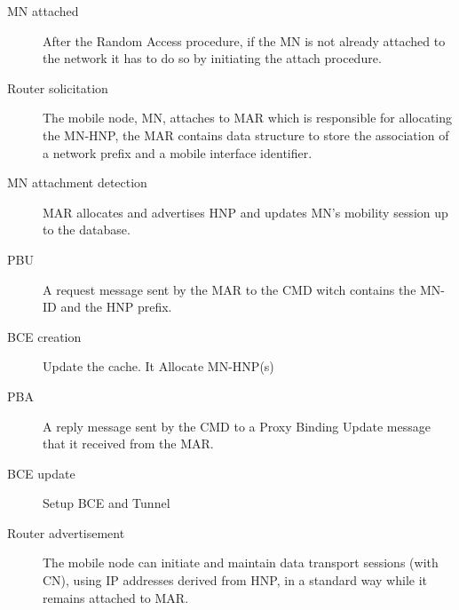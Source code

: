 \documentclass{article}
\begin{document}
\begin{description}
  \item[MN attached]
After the Random Access procedure, if the MN is not already attached
to the network it has to do so by initiating the attach procedure.
  \item[Router solicitation]
The mobile node, MN, attaches to MAR which is responsible for
allocating the MN-HNP, the MAR contains data structure to store the
association of a network prefix and a mobile interface identifier.
  \item[MN attachment detection]
MAR allocates and advertises HNP and updates MN's mobility session up
to the database.
  \item[PBU]
A request message sent by the MAR to the CMD witch contains the MN-ID
and the HNP prefix.
  \item[BCE creation]
Update the cache. It Allocate MN-HNP(s)
  \item[PBA] 
A reply message sent by the CMD to a Proxy Binding Update message that
it received from the MAR.
  \item[BCE update] 
Setup BCE and Tunnel
  \item[Router advertisement] 
The mobile node can initiate and maintain data transport sessions
(with CN), using IP addresses derived from HNP, in a standard way
while it remains attached to MAR.
\end{description}
\end{document}
